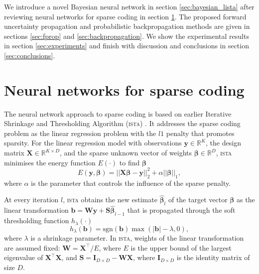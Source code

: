 \documentclass{article}
\begin{document}
We introduce a novel Bayesian neural network in section \ref{sec:bayesian_lista} after reviewing neural networks for sparse coding in section \ref{sec:nn_sc}. The proposed forward uncertainty propagation and probabilistic backpropagation methods are given in sections \ref{sec:fprop} and \ref{sec:backpropagation}. We show the experimental results in section \ref{sec:experiments} and finish with discussion and conclusions in section \ref{sec:conclusions}.


\section{Neural networks for sparse coding}
\label{sec:nn_sc}
The neural network approach to sparse coding is based on earlier Iterative Shrinkage and Thresholding Algorithm (\textsc{ista}) \cite{daubechies2004iterative}. It addresses the sparse coding problem as the linear regression problem with the $l1$ penalty that promotes sparsity. For the linear regression model with observations $\mathbf{y} \in \mathbb{R}^K$, the design matrix $\mathbf{X} \in \mathbb{R}^{K \times D}$, and the sparse unknown vector of weights $\boldsymbol\beta \in \mathbb{R}^D$, \textsc{ista} minimises the energy function $E(\cdot)$ to find $\boldsymbol\beta$
\begin{equation}
\label{eq:regression_problem}
E(\mathbf{y}, \boldsymbol\beta) = ||\mathbf{X}\boldsymbol\beta - \mathbf{y}||_2^2 + \alpha ||\boldsymbol\beta||_1,
\end{equation}
where $\alpha$ is the parameter that controls the influence of the sparse penalty.

At every iteration $l$, \textsc{ista} obtains the new estimate $\widehat{\boldsymbol\beta}_l$ of the target vector $\boldsymbol\beta$ as the linear transformation $\mathbf{b} = \mathbf{W}\mathbf{y} + \mathbf{S}\widehat{\boldsymbol\beta}_{l-1}$ that is propagated through the soft thresholding function $h_\lambda(\cdot)$
\begin{equation}
h_\lambda(\mathbf{b}) = \text{sgn}(\mathbf{b}) \max(|\mathbf{b}| - \lambda, 0),
\end{equation}
where $\lambda$ is a shrinkage parameter.
In \textsc{ista}, weights of the linear transformation are assumed fixed: $\mathbf{W} = \mathbf{X}^\top / E$, where $E$ is the upper bound of the largest eigenvalue of $\mathbf{X}^\top\mathbf{X}$, and $\mathbf{S} = \mathbf{I}_{D \times D} - \mathbf{W}\mathbf{X}$, where $\mathbf{I}_{D \times D}$ is the identity matrix of size $D$.
\end{document}
